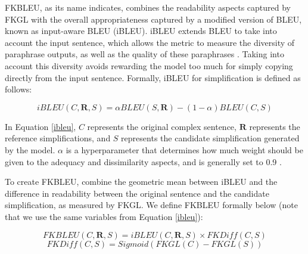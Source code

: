 \documentclass[thesis.tex]{subfiles}
\begin{document}
FKBLEU, as its name indicates, combines the readability aspects captured by FKGL with the overall appropriateness captured by a modified version of BLEU, known as input-aware BLEU (iBLEU). iBLEU extends BLEU to take into account the input sentence, which allows the metric to measure the diversity of paraphrase outputs, as well as the quality of these paraphrases \citep{sun2012joint}. Taking into account this diversity avoids rewarding the model too much for simply copying directly from the input sentence. Formally, iBLEU for simplification is defined as follows:

\begin{equation} \label{ibleu}
    iBLEU(C, \mathbf{R}, S) = \alpha BLEU(S, \mathbf{R}) - (1 - \alpha)BLEU(C, S)
\end{equation}

In Equation \ref{ibleu}, $C$ represents the original complex sentence, $\mathbf{R}$ represents the reference simplifications, and $S$ represents the candidate simplification generated by the model. $\alpha$ is a hyperparameter that determines how much weight should be given to the  adequacy and dissimilarity aspects, and is generally set to 0.9 \citep{sun2012joint}.

To create FKBLEU, \cite{xu2016optimizing} combine the geometric mean between iBLEU and the difference in readability between the original sentence and the candidate simplification, as measured by FKGL. We define FKBLEU formally below (note that we use the same variables from Equation \ref{ibleu}):

\begin{equation} \label{fkbleu}
    FKBLEU(C, \mathbf{R}, S) = iBLEU(C, \mathbf{R}, S) \times FKDiff(C, S)
\end{equation}
\begin{equation}
    FKDiff(C, S) = Sigmoid(FKGL(C) - FKGL(S))
\end{equation}
\end{document}
